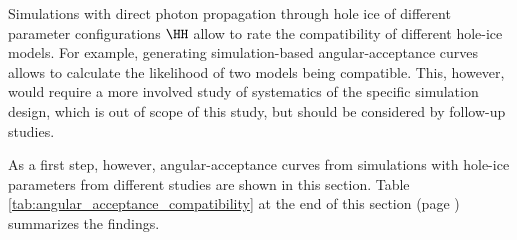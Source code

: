 
\newcommand\ok{\ding{51}} %
\newcommand\same{\cellcolor{black!25}}
\newcommand\greyedout{\cellcolor{black!25}}
\newcommand\bad{\ding{55}}

\newcommand\clsimppc{\noun{clsim+ppc}}

Simulations with direct photon propagation through hole ice of different parameter configurations $\HH$ allow to rate the compatibility of different hole-ice models. For example, generating simulation-based angular-acceptance curves allows to calculate the likelihood of two models being compatible. This, however, would require a more involved study of systematics of the specific simulation design, which is out of scope of this study, but should be considered by follow-up studies.\followup

As a first step, however, angular-acceptance curves from simulations with hole-ice parameters from different studies are shown in this section. Table \ref{tab:angular_acceptance_compatibility} at the end of this section (page \pageref{tab:angular_acceptance_compatibility}) summarizes the findings.


%
%
%
%
%
%
